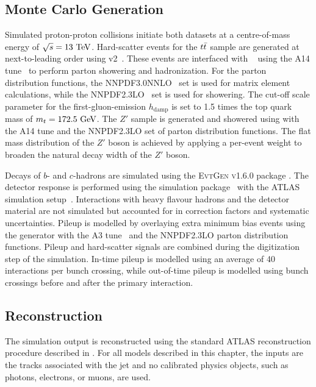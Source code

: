 \subsection{Monte Carlo Generation}

Simulated proton-proton collisions initiate both datasets at a centre-of-mass energy of $\sqrt{s} = 13~\TeV$.
Hard-scatter events for the $t\bar{t}$ sample are generated at next-to-leading order using \powheg v2~\cite{Powheg1, Powheg2, Powheg3}.
These events are interfaced with ~\cite{Pythia8} using the \textsc{A14} tune~\cite{A14} to perform parton showering and hadronization.
For the parton distribution functions, the \textsc{NNPDF3.0NNLO}~\cite{PDF3.0} set is used for matrix element calculations, while the \textsc{NNPDF2.3LO}~\cite{PDF2.3} set is used for showering.
The cut-off scale parameter for the first-gluon-emission $h_{\text{damp}}$ is set to 1.5 times the top quark mass of $m_t = 172.5~\GeV$.
The $Z'$ sample is generated and showered using  with the \textsc{A14} tune and the \textsc{NNPDF2.3LO} set of parton distribution functions.
The flat mass distribution of the $Z'$ boson is achieved by applying a per-event weight to broaden the natural decay width of the $Z'$ boson.

Decays of $b$- and $c$-hadrons are simulated using the \textsc{EvtGen v1.6.0} package \cite{EvtGen}.
The detector response is performed using the \geant simulation package~\cite{Geant4} with the ATLAS simulation setup~\cite{ATLASSim}.
Interactions with heavy flavour hadrons and the detector material are not simulated but accounted for in correction factors and systematic uncertainties.
Pileup is modelled by overlaying extra minimum bias events using the  generator with the \textsc{A3} tune~\cite{A3} and the \textsc{NNPDF2.3LO} parton distribution functions.
Pileup and hard-scatter signals are combined during the digitization step of the simulation.
In-time pileup is modelled using an average of 40 interactions per bunch crossing, while out-of-time pileup is modelled using bunch crossings before and after the primary interaction.

\subsection{Reconstruction}

The simulation output is reconstructed using the standard ATLAS reconstruction procedure described in .
For all models described in this chapter, the inputs are the tracks associated with the jet and no calibrated physics objects, such as photons, electrons, or muons, are used.

